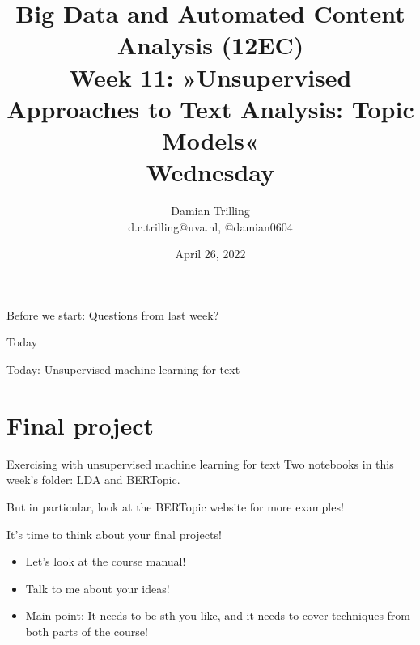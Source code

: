 

\graphicspath{{../../resources/img/}}




\title[Big Data and Automated Content Analysis]{\textbf{Big Data and Automated Content Analysis (12EC)} 
\\Week 11: »Unsupervised Approaches to Text Analysis: Topic Models«
\\Wednesday}
\author[Damian Trilling]{Damian Trilling\\ \footnotesize{d.c.trilling@uva.nl, @damian0604 \\}}
\date{April 26, 2022}


\begin{frame}{}
	\titlepage
\end{frame}

\begin{frame}[standout]
Before we start: Questions from last week?
\end{frame}



\begin{frame}{Today}
	\tableofcontents
\end{frame}

\begin{frame}[standout]
Today: Unsupervised machine learning for text
\end{frame}









\section{Final project}
\begin{frame}{Exercising with unsupervised machine learning for text}
Two notebooks in this week's folder: LDA and BERTopic.

But in particular, look at the BERTopic website for more examples!
\end{frame}


\begin{frame}{It's time to think about your final projects!}
\begin{itemize}
\item Let's look at the course manual!
\item Talk to me about your ideas!
\item Main point: It needs to be sth you like, and it needs to cover techniques from both parts of the course!
\end{itemize}
\end{frame}




\begin{frame}
	\printbibliography
\end{frame}




